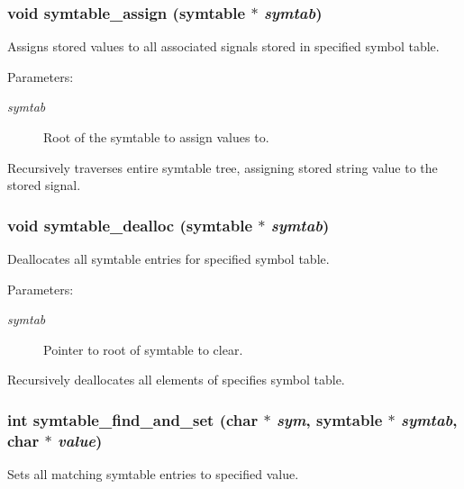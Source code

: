 \subsubsection{\setlength{\rightskip}{0pt plus 5cm}void symtable\_\-assign ({\bf symtable} $\ast$ {\em symtab})}\label{symtable_8c_a3}


Assigns stored values to all associated signals stored in specified symbol table.

\begin{Desc}
\item[Parameters:]
\begin{description}
\item[{\em symtab}]Root of the symtable to assign values to.\end{description}
\end{Desc}
Recursively traverses entire symtable tree, assigning stored string value to the stored signal. 
\subsubsection{\setlength{\rightskip}{0pt plus 5cm}void symtable\_\-dealloc ({\bf symtable} $\ast$ {\em symtab})}\label{symtable_8c_a4}


Deallocates all symtable entries for specified symbol table.

\begin{Desc}
\item[Parameters:]
\begin{description}
\item[{\em symtab}]Pointer to root of symtable to clear.\end{description}
\end{Desc}
Recursively deallocates all elements of specifies symbol table. 
\subsubsection{\setlength{\rightskip}{0pt plus 5cm}int symtable\_\-find\_\-and\_\-set (char $\ast$ {\em sym}, {\bf symtable} $\ast$ {\em symtab}, char $\ast$ {\em value})}\label{symtable_8c_a1}


Sets all matching symtable entries to specified value.

